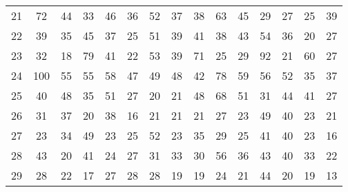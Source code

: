 \documentclass[a4paper,12pt]{article}
\begin{document}
\begin{landscape}
\begin{footnotesize}
\begin{center}
\begin{longtable}{lcccccccccccccc}
21&72&44&33&46&36&52&37&38&63&45&29&27&25&39 \\
22&39&35&45&37&25&51&39&41&38&43&54&36&20&27 \\
23&32&18&79&41&22&53&39&71&25&29&92&21&60&27 \\
24&100&55&55&58&47&49&48&42&78&59&56&52&35&37 \\
25&40&48&35&51&27&20&21&48&68&51&31&44&41&27 \\
26&31&37&20&38&16&21&21&21&27&23&49&40&23&21 \\
27&23&34&49&23&25&52&23&35&29&25&41&40&23&16 \\
28&43&20&41&24&27&31&33&30&56&36&43&40&33&22 \\
29&28&22&17&27&28&28&19&19&24&21&44&20&19&13 \\ \hline
\end{longtable}
\end{center}
\end{footnotesize}
\end{landscape}
\end{document}
